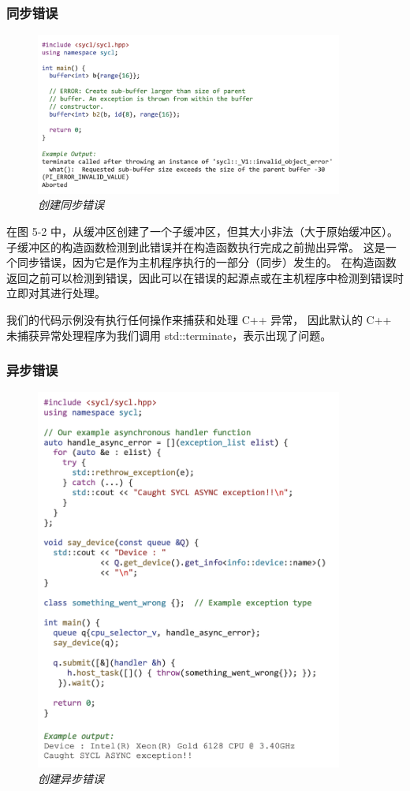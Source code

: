 \subsubsection{同步错误}
\begin{figure}[H]
	\centering
	\includegraphics[width=0.9\textwidth]{figs/F5.2.png}
	\caption{\textit{创建同步错误}}
\end{figure}

在图 5-2 中，从缓冲区创建了一个子缓冲区，但其大小非法（大于原始缓冲区）。 
子缓冲区的构造函数检测到此错误并在构造函数执行完成之前抛出异常。 
这是一个同步错误，因为它是作为主机程序执行的一部分（同步）发生的。 
在构造函数返回之前可以检测到错误，因此可以在错误的起源点或在主机程序中检测到错误时立即对其进行处理。

我们的代码示例没有执行任何操作来捕获和处理 C++ 异常，
因此默认的 C++ 未捕获异常处理程序为我们调用 std::terminate，表示出现了问题。

\subsubsection{异步错误}
\begin{figure}[H]
	\centering
	\includegraphics[width=0.9\textwidth]{figs/F5.3.png}
	\caption{\textit{创建异步错误}}
\end{figure}

